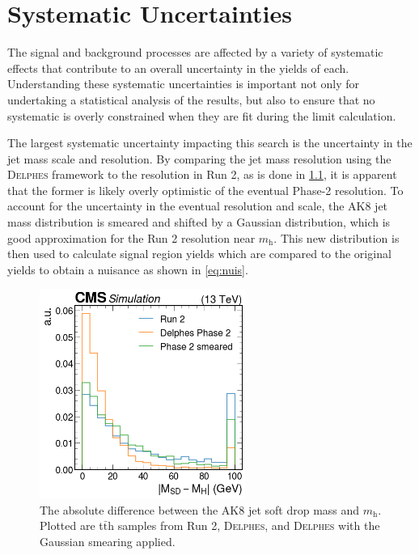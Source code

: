 \chapter{Systematic Uncertainties}
The signal and background processes are affected by a variety of systematic effects that contribute to an overall uncertainty in the yields of each. Understanding these systematic uncertainties is important not only for undertaking a statistical analysis of the results, but also to ensure that no systematic is overly constrained when they are fit during the limit calculation.

The largest systematic uncertainty impacting this search is the uncertainty in the jet mass scale and resolution. By comparing the jet mass resolution using the \textsc{Delphes} framework to the resolution in Run 2, as is done in \cref{fig:jmr}, it is apparent that the former is likely overly optimistic of the eventual Phase-2 resolution. To account for the uncertainty in the eventual resolution and scale, the AK8 jet mass distribution is smeared and shifted by a Gaussian distribution, which is good approximation for the Run 2 resolution near $m_\mathrm{h}$. This new distribution is then used to calculate signal region yields which are compared to the original yields to obtain a nuisance as shown in \cref{eq:nuis}.

\begin{figure}[ht]
\centering
\includegraphics[width=0.6\textwidth]{Chapters/Systematics/jmr.png}
\caption{The absolute difference between the AK8 jet soft drop mass and $m_\mathrm{h}$. Plotted are t$\bar{\mathrm{t}}$h samples from Run 2, \textsc{Delphes}, and \textsc{Delphes} with the Gaussian smearing applied.}
\label{fig:jmr}
\end{figure}


